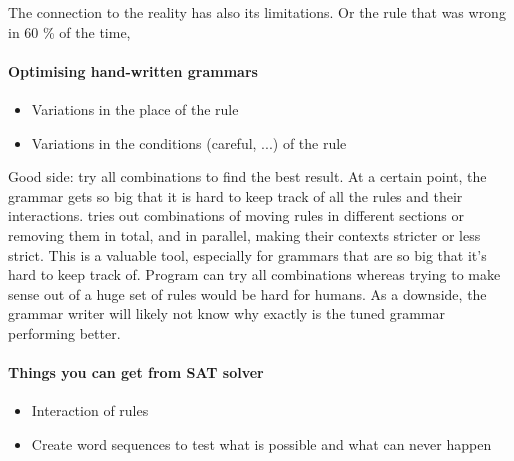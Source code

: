 The connection to the reality has also its limitations. 
Or the rule that was wrong in 60 \% of the time,



\paragraph{Optimising hand-written grammars}
\begin{itemize}
\item Variations in the place of the rule
\item Variations in the conditions (careful, ...) of the rule
\end{itemize}
Good side: try all combinations to find the best result. 
At a certain point, the grammar gets so big that it is hard to keep track of all the rules and their interactions. \cite{bick2013tuning} tries out combinations of moving rules in different sections or removing them in total, and in parallel, making their contexts stricter or less strict. 
This is a valuable tool, especially for grammars that are so big that it's hard to keep track of. Program can try all combinations whereas trying to make sense out of a huge set of rules would be hard for humans.
As a downside, the grammar writer will likely not know why exactly is the tuned grammar performing better.


\paragraph{Things you can get from SAT solver}

\begin{itemize}
\item Interaction of rules
\item Create word sequences to test what is possible and what can never happen
\end{itemize}











